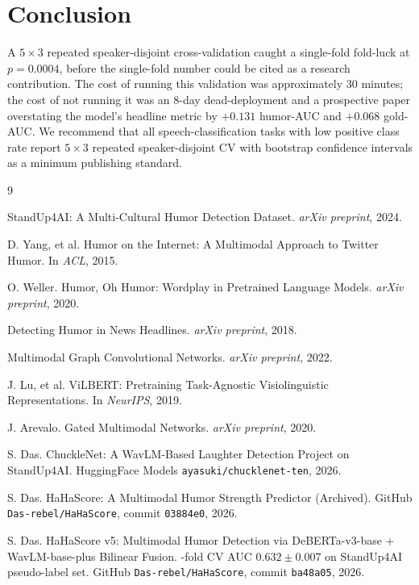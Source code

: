\documentclass[11pt, letterpaper]{article}
\begin{document}
\section{Conclusion}

A $5\times3$ repeated speaker-disjoint cross-validation caught a single-fold
fold-luck at $p=0.0004$, before the single-fold number could be cited as a
research contribution. The cost of running this validation was approximately
30 minutes; the cost of not running it was an 8-day dead-deployment and a
prospective paper overstating the model's headline metric by $+0.131$
humor-AUC and $+0.068$ gold-AUC. We recommend that all speech-classification
tasks with low positive class rate report $5\times3$ repeated
speaker-disjoint CV with bootstrap confidence intervals as a minimum
publishing standard.

\begin{thebibliography}{9}

StandUp4AI: A Multi-Cultural Humor Detection Dataset.
\textit{arXiv preprint}, 2024.

D. Yang, et al.
\newblock Humor on the Internet: A Multimodal Approach to Twitter Humor.
\newblock In \textit{ACL}, 2015.

O. Weller.
\newblock Humor, Oh Humor: Wordplay in Pretrained Language Models.
\newblock \textit{arXiv preprint}, 2020.

Detecting Humor in News Headlines.
\newblock \textit{arXiv preprint}, 2018.

Multimodal Graph Convolutional Networks.
\newblock \textit{arXiv preprint}, 2022.

J. Lu, et al.
\newblock ViLBERT: Pretraining Task-Agnostic Visiolinguistic Representations.
\newblock In \textit{NeurIPS}, 2019.

J. Arevalo.
\newblock Gated Multimodal Networks.
\newblock \textit{arXiv preprint}, 2020.

S. Das.
\newblock ChuckleNet: A WavLM-Based Laughter Detection Project on StandUp4AI.
\newblock HuggingFace Models \texttt{ayasuki/chucklenet-ten}, 2026.

S. Das.
\newblock HaHaScore: A Multimodal Humor Strength Predictor (Archived).
\newblock GitHub \texttt{Das-rebel/HaHaScore}, commit
\texttt{03884e0}, 2026.

S. Das.
\newblock HaHaScore v5: Multimodal Humor Detection via DeBERTa-v3-base + WavLM-base-plus Bilinear Fusion.
-fold CV AUC $0.632 \pm 0.007$ on StandUp4AI pseudo-label set.
\newblock GitHub \texttt{Das-rebel/HaHaScore}, commit \texttt{ba48a05}, 2026.

\end{thebibliography}
\end{document}
